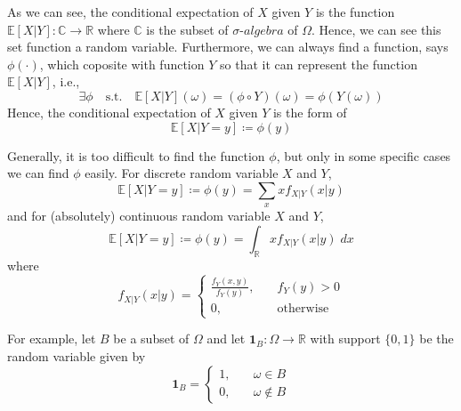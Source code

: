 \documentclass[twoside]{article}
\theoremstyle{definition}
\theoremstyle{remark}
\theoremstyle{remark}
\begin{document}
As we can see, the conditional expectation of $X$ given $Y$ is the function
$\mathbb{E}[X|Y]: \mathbb{C} \rightarrow \mathbb{R}$ where $\mathbb{C}$ is the
subset of $\sigma$-$algebra$ of $\Omega$. Hence, we can see this set function a
random variable. Furthermore, we can always find a function, says $\phi(\cdot)$,
which coposite with function $Y$ so that it can represent the function $\mathbb{E}[X|Y]$,
i.e.,
\begin{equation}
  \exists \phi \quad \textrm{s.t.} \quad \mathbb{E}[X | Y](\omega) = (\phi \circ Y)(\omega) = \phi(Y(\omega))
\end{equation}
Hence, the conditional expectation of $X$ given $Y$ is the form of
\begin{equation}
  \mathbb{E}[X | Y = y] \coloneqq \phi(y)
\end{equation}

Generally, it is too difficult to find the function $\phi$, but only in some
specific cases we can find $\phi$ easily. For discrete random variable $X$ and $Y$,
\begin{equation}
  \mathbb{E}[X | Y = y] \coloneqq \phi(y) = \sum_{x} x f_{X|Y} (x|y)
\end{equation}
and for (absolutely) continuous random variable $X$ and $Y$,
\begin{equation}
  \mathbb{E}[X | Y = y] \coloneqq \phi(y) = \int_{\mathbb{R}} x f_{X|Y} (x|y) \;dx
\end{equation}
where
\begin{equation}
  f_{X|Y} (x|y) = \left\{
  \begin{array}{ll}
    \frac{f_Y(x,y)}{f_Y(y)}, \quad & f_Y(y) > 0 \\
    0,                       \quad & \textrm{otherwise}
  \end{array}
  \right.
\end{equation}

For example, let $B$ be a subset of $\Omega$ and let $\mathbf{1}_B: \Omega \rightarrow \mathbb{R}$
with support $\{0, 1\}$ be the random variable given by
\begin{equation}
  \mathbf{1}_B = \left\{
  \begin{array}{ll}
    1, \quad & \omega \in B \\
    0, \quad & \omega \notin B
  \end{array}
  \right.
\end{equation}

\clearpage
\end{document}
